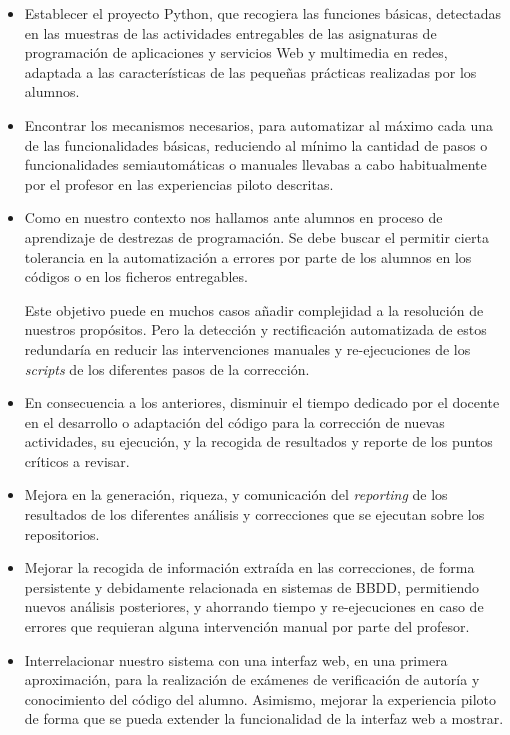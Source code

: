 \begin{itemize}
\item Establecer el proyecto Python, que recogiera las funciones básicas, detectadas en las muestras de las actividades entregables de las asignaturas de programación de aplicaciones y servicios Web y multimedia en redes, adaptada a las características de las pequeñas prácticas realizadas por los alumnos.

\item Encontrar los mecanismos necesarios, para automatizar al máximo cada una de las funcionalidades básicas, reduciendo al mínimo la cantidad de pasos o funcionalidades semiautomáticas o manuales llevabas a cabo habitualmente por el profesor en las experiencias piloto descritas.

\item Como en nuestro contexto nos hallamos ante alumnos en proceso de aprendizaje de destrezas de programación. Se debe buscar el permitir cierta tolerancia en la automatización a errores por parte de los alumnos en los códigos o en los ficheros entregables.


Este objetivo puede en muchos casos añadir complejidad a la resolución de nuestros propósitos. Pero la detección y rectificación automatizada de estos redundaría en reducir las intervenciones manuales y re-ejecuciones de los \textit{scripts} de los diferentes pasos de la corrección.

\item En consecuencia a los anteriores, disminuir el tiempo dedicado por el docente en el desarrollo o adaptación del código para la corrección de nuevas actividades, su ejecución, y la recogida de resultados y reporte de los puntos críticos a revisar.

\item Mejora en la generación, riqueza, y comunicación del \textit{reporting} de los resultados de los diferentes análisis y correcciones que se ejecutan sobre los repositorios.

\item Mejorar la recogida de información extraída en las correcciones, de forma persistente y debidamente relacionada en sistemas de BBDD, permitiendo nuevos análisis posteriores, y ahorrando tiempo y re-ejecuciones en caso de errores que requieran alguna intervención manual por parte del profesor.

\item Interrelacionar nuestro sistema con una interfaz web, en una primera aproximación, para la realización de exámenes de verificación de autoría y conocimiento del código del alumno. Asimismo, mejorar la experiencia piloto de forma que se pueda extender la funcionalidad de la interfaz web a mostrar.


\end{itemize}
